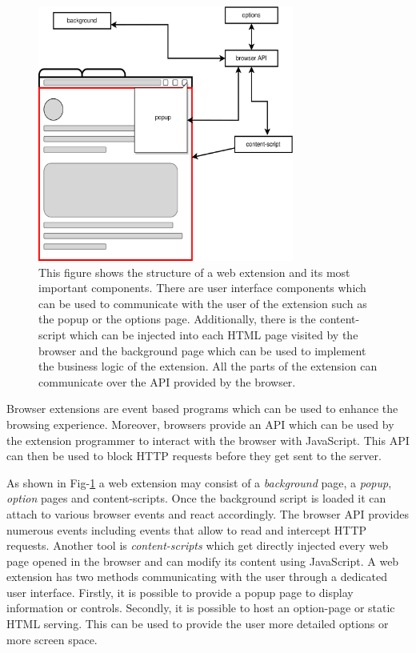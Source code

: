 \begin{figure}[ht!]
  \begin{center}
    \includegraphics[width=0.75\textwidth]{images/ExtensionOverview.png}
  \end{center}
  \caption{This figure shows the structure of a web extension and its most important components. There are user interface components which 
  can be used to communicate with the user of the extension such as the popup or the options page. Additionally, there is the content-script
which can be injected into each HTML page visited by the browser and the background page which can be used to implement the business logic of the extension. All the parts of the 
extension can communicate over the API provided by the browser.}
  \label{fig:extOver}
\end{figure}

Browser extensions are event based programs which can be used to enhance the browsing
experience. Moreover, browsers provide an API which can be used by the extension programmer to interact with the browser with JavaScript.
This API can then be used to block HTTP requests before they get sent to the server.

As shown in Fig-\ref{fig:extOver} a web extension may consist of a \emph{background} page, a \emph{popup}, \emph{option} pages and
content-scripts. Once the background script is loaded it can attach to various browser events and react accordingly. The browser API
provides numerous events \cite{browserApi} including events that allow to read and intercept HTTP requests. Another tool is  
\emph{content-scripts} which get directly injected every web page opened in the browser and can modify its content using
JavaScript. A web extension has two methods communicating with the user through a dedicated user interface. Firstly, it is possible
to provide a popup page to display information or controls. Secondly, it is possible to host an option-page or static HTML serving. This can
be used to provide the user more detailed options or more screen space.

